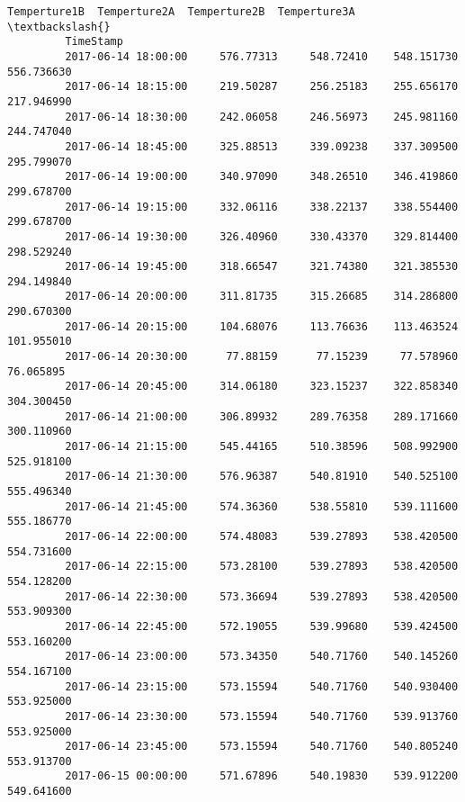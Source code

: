 \documentclass[11pt]{article}
\begin{document}
\begin{Verbatim}[commandchars=\\\{\}]
                              Temperture1B  Temperture2A  Temperture2B  Temperture3A  \textbackslash{}
         TimeStamp                                                                     
         2017-06-14 18:00:00     576.77313     548.72410    548.151730    556.736630   
         2017-06-14 18:15:00     219.50287     256.25183    255.656170    217.946990   
         2017-06-14 18:30:00     242.06058     246.56973    245.981160    244.747040   
         2017-06-14 18:45:00     325.88513     339.09238    337.309500    295.799070   
         2017-06-14 19:00:00     340.97090     348.26510    346.419860    299.678700   
         2017-06-14 19:15:00     332.06116     338.22137    338.554400    299.678700   
         2017-06-14 19:30:00     326.40960     330.43370    329.814400    298.529240   
         2017-06-14 19:45:00     318.66547     321.74380    321.385530    294.149840   
         2017-06-14 20:00:00     311.81735     315.26685    314.286800    290.670300   
         2017-06-14 20:15:00     104.68076     113.76636    113.463524    101.955010   
         2017-06-14 20:30:00      77.88159      77.15239     77.578960     76.065895   
         2017-06-14 20:45:00     314.06180     323.15237    322.858340    304.300450   
         2017-06-14 21:00:00     306.89932     289.76358    289.171660    300.110960   
         2017-06-14 21:15:00     545.44165     510.38596    508.992900    525.918100   
         2017-06-14 21:30:00     576.96387     540.81910    540.525100    555.496340   
         2017-06-14 21:45:00     574.36360     538.55810    539.111600    555.186770   
         2017-06-14 22:00:00     574.48083     539.27893    538.420500    554.731600   
         2017-06-14 22:15:00     573.28100     539.27893    538.420500    554.128200   
         2017-06-14 22:30:00     573.36694     539.27893    538.420500    553.909300   
         2017-06-14 22:45:00     572.19055     539.99680    539.424500    553.160200   
         2017-06-14 23:00:00     573.34350     540.71760    540.145260    554.167100   
         2017-06-14 23:15:00     573.15594     540.71760    540.930400    553.925000   
         2017-06-14 23:30:00     573.15594     540.71760    539.913760    553.925000   
         2017-06-14 23:45:00     573.15594     540.71760    540.805240    553.913700   
         2017-06-15 00:00:00     571.67896     540.19830    539.912200    549.641600   
         

\end{Verbatim}
\end{document}
